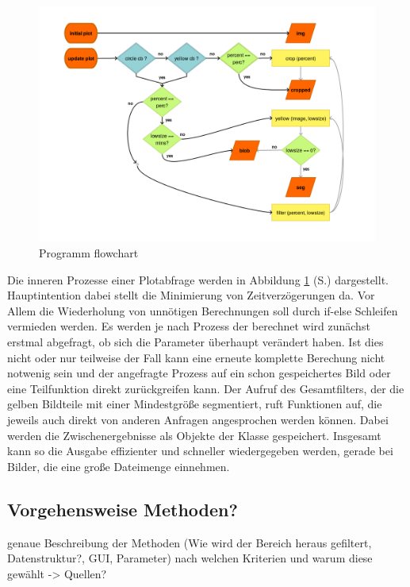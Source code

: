 \begin{figure}[htb]
 \centering
 \includegraphics[width=\textwidth,angle=0]{abb/prozess-flow}
 \caption{Programm flowchart}
\label{fig:flowchart}
\end{figure}

Die inneren Prozesse einer Plotabfrage werden in Abbildung \ref{fig:flowchart} (S.\pageref{fig:flowchart}) dargestellt. Hauptintention dabei stellt die Minimierung von Zeitverzögerungen da. Vor Allem die Wiederholung von unnötigen Berechnungen soll durch if-else Schleifen vermieden werden. Es werden je nach Prozess der berechnet wird zunächst erstmal abgefragt, ob sich die Parameter überhaupt verändert haben. 
Ist dies nicht oder nur teilweise der Fall kann eine erneute komplette Berechung nicht notwenig sein und der angefragte Prozess auf ein schon gespeichertes Bild oder eine Teilfunktion direkt zurückgreifen kann. Der Aufruf des Gesamtfilters, der die gelben Bildteile mit einer Mindestgröße segmentiert, ruft Funktionen auf, die jeweils auch direkt von anderen Anfragen angesprochen werden können. Dabei werden die Zwischenergebnisse als Objekte der Klasse gespeichert. Insgesamt kann so die Ausgabe effizienter und schneller wiedergegeben werden, gerade bei Bilder, die eine große Dateimenge einnehmen.

\subsection{Vorgehensweise Methoden?}

genaue Beschreibung der Methoden (Wie wird der Bereich heraus gefiltert, Datenstruktur?, GUI, Parameter)
nach welchen Kriterien und warum diese gewählt -> Quellen?


